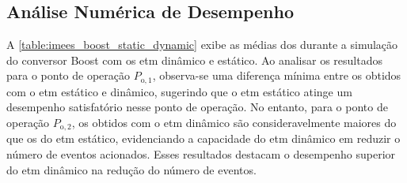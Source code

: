 \subsection{Análise Numérica de Desempenho}

A \autoref{table:imees_boost_static_dynamic} exibe as médias dos  durante a simulação do conversor Boost com os \acrshort{etm} dinâmico e estático. Ao analisar os resultados para o ponto de operação $P_{\mathrm{o}, 1}$, observa-se uma diferença mínima entre os  obtidos com o \acrshort{etm} estático e dinâmico, sugerindo que o \acrshort{etm} estático atinge um desempenho satisfatório nesse ponto de operação. No entanto, para o ponto de operação $P_{\mathrm{o}, 2}$, os  obtidos com o \acrshort{etm} dinâmico são consideravelmente maiores do que os do \acrshort{etm} estático, evidenciando a capacidade do \acrshort{etm} dinâmico em reduzir o número de eventos acionados. Esses resultados destacam o desempenho superior do \acrshort{etm} dinâmico na redução do número de eventos.

